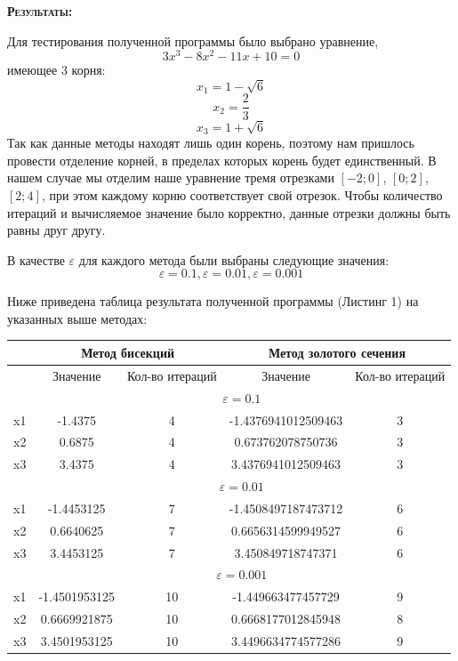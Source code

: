 \documentclass [12pt]{article}
\begin{document}
\textsc{\textbf{Результаты:}}

Для тестирования полученной программы было выбрано уравнение, $$ 3x^3-8x^2-11x+10=0$$ имеющее 3 корня:
$$x_1 = 1-\sqrt{6}$$ 
$$x_2 = \frac{2}{3}$$
$$x_3 = 1+\sqrt{6}$$
Так как данные методы находят лишь один корень, поэтому нам пришлось провести отделение корней, в пределах которых корень будет единственный. 
В нашем случае мы отделим наше уравнение тремя отрезками $[-2;0]$, $[0;2]$, $[2;4]$, при этом каждому корню соответствует свой отрезок.
Чтобы количество итераций и вычисляемое значение было корректно, данные отрезки должны быть равны друг другу.


В качестве  $\varepsilon$ для каждого метода были выбраны следующие значения: $$\varepsilon=0.1,\varepsilon=0.01,\varepsilon=0.001$$

Ниже приведена таблица результата полученной программы (Листинг 1) на указанных выше методах:

\begin{center}
\begin{tabular}{ |c|c|c|c|c| }
  \hline
  & \multicolumn{2}{|c|}{Метод бисекций}
  & \multicolumn{2}{|c|}{Метод золотого сечения} \\ \hline
  & Значение & Кол-во итераций & Значение & Кол-во итераций \\ \hline
  & \multicolumn{4}{|c|}{$\varepsilon=0.1$} \\ \hline
  x1 & -1.4375 & 4 & -1.4376941012509463 & 3  \\ \hline
  x2 & 0.6875 & 4 & 0.673762078750736 & 3 \\ \hline
  x3 & 3.4375 & 4 & 3.4376941012509463 & 3 \\ \hline
  & \multicolumn{4}{|c|}{$\varepsilon=0.01$} \\ \hline
  x1 & -1.4453125 & 7 & -1.4508497187473712 & 6  \\ \hline
  x2 & 0.6640625 & 7 & 0.6656314599949527 & 6 \\ \hline
  x3 & 3.4453125 & 7 & 3.450849718747371 & 6 \\ \hline
  & \multicolumn{4}{|c|}{$\varepsilon=0.001$} \\ \hline
  x1 & -1.4501953125 & 10 & -1.449663477457729 & 9  \\ \hline
  x2 & 0.6669921875 & 10 & 0.6668177012845948 & 8 \\ \hline
  x3 & 3.4501953125 & 10 & 3.4496634774577286 & 9 \\ \hline
\end{tabular}
\end{center}
\end{document}
